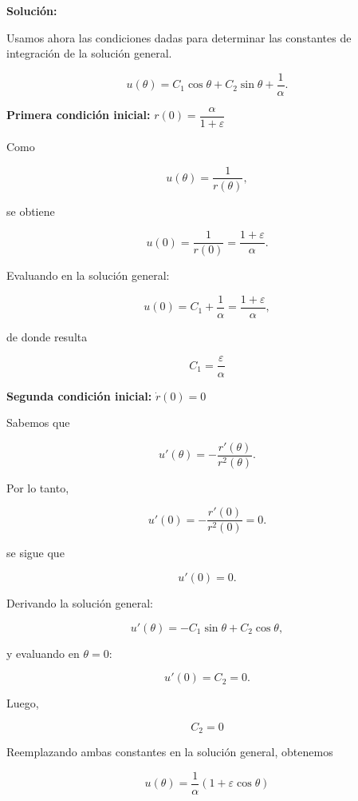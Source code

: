 \documentclass[10pt,a4paper]{article}
\newenvironment{solution}{\par\noindent\textbf{Solución: } }{}
\begin{document}
\begin{solution}
\vspace{0.2cm}

Usamos ahora las condiciones dadas para determinar las constantes de integración de la solución general.

\[
u(\theta)
=
C_1\cos\theta
+
C_2\sin\theta
+
\frac{1}{\alpha}.
\]

\vspace{0.3cm}

\noindent
\textbf{Primera condición inicial:} \(r(0)=\dfrac{\alpha}{1+\varepsilon}\)

\vspace{0.2cm}

Como

\[
u(\theta)=\frac{1}{r(\theta)},
\]

se obtiene

\[
u(0)
=
\frac{1}{r(0)}
=
\frac{1+\varepsilon}{\alpha}.
\]

Evaluando en la solución general:

\[
u(0)
=
C_1+\frac{1}{\alpha}
=
\frac{1+\varepsilon}{\alpha},
\]

de donde resulta

\[
\boxed{
C_1=\frac{\varepsilon}{\alpha}
}
\]

\vspace{0.4cm}

\noindent
\textbf{Segunda condición inicial:} \(\dot r(0)=0\)

\vspace{0.2cm}

Sabemos que

\[
u'(\theta)
=
-\frac{r'(\theta)}{r^2(\theta)}.
\]

Por lo tanto,

\[
u'(0)
=
-\frac{r'(0)}{r^2(0)}
=
0.
\]

se sigue que

\[
u'(0)=0.
\]

Derivando la solución general:

\[
u'(\theta)
=
-C_1\sin\theta
+
C_2\cos\theta,
\]

y evaluando en \(\theta=0\):

\[
u'(0)=C_2=0.
\]

Luego,

\[
\boxed{
C_2=0
}
\]

\vspace{0.4cm}

Reemplazando ambas constantes en la solución general, obtenemos


\[
\boxed{
u(\theta)
=
\frac{1}{\alpha}
\left(
1+\varepsilon\cos\theta
\right)
}
\]


\end{solution}
\end{document}
